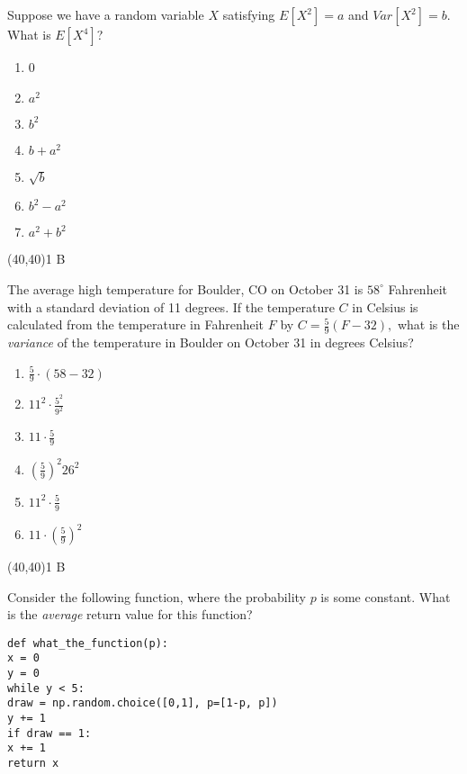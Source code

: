 \documentclass[addpoints]{exam}
\def\solutions{0}
\begin{document}
{\begin{questions}
\clearpage
\question[3] Suppose we have a random variable $X$ satisfying $E[X^2]=a$ and $Var[X^2]=b$.  What is $E[X^4]$?
\begin{minipage}[b]{.85\textwidth}
	\begin{enumerate}[label=\Alph*.]
		\item 0
		\item $a^2$
		\item $b^2$
		\item $b+a^2$
		\item $\sqrt{b}$
		\item $b^2-a^2$
		\item $a^2+b^2$
	\end{enumerate}
\end{minipage}
\begin{minipage}[b]{.1\textwidth}
	\vspace{\fill}\framebox(40,40){\if\solutions1 B \fi}
\end{minipage}

\question[3] The average high temperature for Boulder, CO on October 31 is $58^\circ$ Fahrenheit with a standard deviation of 11 degrees.  If the temperature $C$ in Celsius is calculated from the temperature in Fahrenheit $F$ by  $C=\frac{5}{9}(F-32),$ what is the \textit{variance} of the temperature in Boulder on October 31 in degrees Celsius?

\begin{minipage}[b]{.85\textwidth}
	\begin{enumerate}[label=\Alph*.]
		\item $\frac{5}{9}\cdot (58-32)$
		\item $11^2 \cdot \frac{5^2}{9^2}$
		\item $11\cdot \frac{5}{9}$
		\item $\left( \frac{5}{9}\right)^2 26^2$
		\item $11^2 \cdot \frac{5}{9}$
		\item $11\cdot \left( \frac{5}{9}\right) ^2$
	\end{enumerate}
\end{minipage}
\begin{minipage}[b]{.1\textwidth}
	\vspace{\fill}\framebox(40,40){\if\solutions1 B \fi}
\end{minipage}

\question[3] Consider the following function, where the probability $p$ is some constant.  What is the \textit{average} return value for this function?
\begin{lstlisting}
def what_the_function(p):
x = 0
y = 0
while y < 5:
draw = np.random.choice([0,1], p=[1-p, p])
y += 1
if draw == 1:
x += 1
return x
\end{lstlisting}


\end{questions}}
\end{document}
